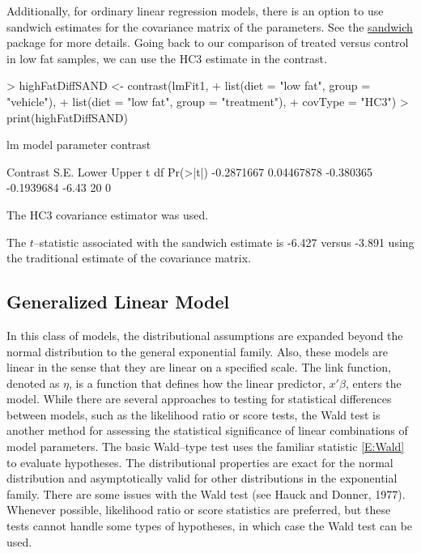 \documentclass[12pt]{article}
\renewenvironment{Schunk}{\vspace{\topsep}}{\vspace{\topsep}}
\begin{document}
 
Additionally, for ordinary linear regression models, there is an option to use sandwich estimates for the covariance matrix of the parameters. See the \href{http://cran.r-project.org/src/contrib/Descriptions/sandwich.html}{sandwich} package for more details. Going back to our comparison of treated versus control in low fat samples, we can use the HC3 estimate in the contrast. 
\begin{Schunk}
\begin{Sinput}
> highFatDiffSAND <- contrast(lmFit1, 
+                             list(diet = "low fat", group = "vehicle"),
+                             list(diet = "low fat", group = "treatment"),
+                             covType = "HC3")
> print(highFatDiffSAND)
\end{Sinput}
\begin{Soutput}
lm model parameter contrast

   Contrast       S.E.     Lower      Upper     t df Pr(>|t|)
 -0.2871667 0.04467878 -0.380365 -0.1939684 -6.43 20        0

The HC3 covariance estimator was used.
\end{Soutput}
\end{Schunk}


The $t$--statistic associated with the sandwich estimate is -6.427 versus -3.891 using the traditional estimate of the covariance matrix.



\subsection{Generalized Linear Model}

In this class of models, the distributional assumptions are expanded beyond the normal distribution to the general exponential family. Also, these models are linear in the sense that they are linear on a specified scale. The link function, denoted as $\eta$, is a function that defines how the linear predictor, $x'\beta$, enters the model. While there are several approaches to testing for statistical differences between models, such as the likelihood ratio or score tests, the Wald test is another method for assessing the statistical significance of linear combinations of model parameters. The basic Wald--type test uses the familiar statistic \ref{E:Wald} to evaluate hypotheses. The distributional properties are exact for the normal distribution and asymptotically valid for other distributions in the exponential family. There are some issues with the Wald test (see Hauck and Donner, 1977). Whenever possible, likelihood ratio or score statistics are preferred, but these tests cannot handle some types of hypotheses, in which case the Wald test can be used.
\end{document}
